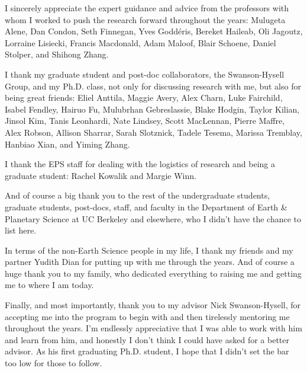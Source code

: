 \documentclass{ucbthesis}
\begin{document}
\begin{frontmatter}
\begin{acknowledgements}
I sincerely appreciate the expert guidance and advice from the professors with whom I worked to push the research forward throughout the years: Mulugeta Alene, Dan Condon, Seth Finnegan, Yves Godd\'eris, Bereket Haileab, Oli Jagoutz, Lorraine Lisiecki, Francis Macdonald, Adam Maloof, Blair Schoene, Daniel Stolper, and Shihong Zhang.

I thank my graduate student and post-doc collaborators, the Swanson-Hysell Group, and my Ph.D. class, not only for discussing research with me, but also for being great friends: Eliel Anttila, Maggie Avery, Alex Charn, Luke Fairchild, Isabel Fendley, Hairuo Fu, Mulubrhan Gebreslassie, Blake Hodgin, Taylor Kilian, Jinsol Kim, Tanis Leonhardi, Nate Lindsey, Scott MacLennan, Pierre Maffre, Alex Robson, Allison Sharrar, Sarah Slotznick, Tadele Tesema, Marissa Tremblay, Hanbiao Xian, and Yiming Zhang.

I thank the EPS staff for dealing with the logistics of research and being a graduate student: Rachel Kowalik and Margie Winn.

And of course a big thank you to the rest of the undergraduate students, graduate students, post-docs, staff, and faculty in the Department of Earth \& Planetary Science at UC Berkeley and elsewhere, who I didn't have the chance to list here.

In terms of the non-Earth Science people in my life, I thank my friends and my partner Yudith Dian for putting up with me through the years. And of course a huge thank you to my family, who dedicated everything to raising me and getting me to where I am today.

Finally, and most importantly, thank you to my advisor Nick Swanson-Hysell, for accepting me into the program to begin with and then tirelessly mentoring me throughout the years. I'm endlessly appreciative that I was able to work with him and learn from him, and honestly I don't think I could have asked for a better advisor. As his first graduating Ph.D. student, I hope that I didn't set the bar too low for those to follow.

\end{acknowledgements}

\end{frontmatter}


\pagestyle{headings}











\appendix



\end{document}
